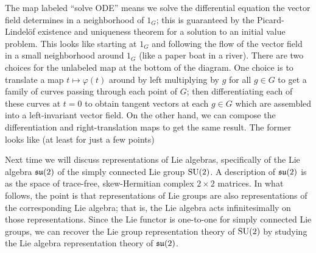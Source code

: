 \documentclass[../../rtnotes.tex]{subfiles}
\begin{document}
The map labeled ``solve ODE'' means we solve the differential equation the vector field determines in a neighborhood of $1_G$; this is guaranteed by the Picard-Lindel\"of existence and uniqueness theorem for a solution to an initial value problem. This looks like starting at $1_G$ and following the flow of the vector field in a small neighborhood around $1_G$ (like a paper boat in a river). There are two choices for the unlabeled map at the bottom of the diagram. One choice is to translate a map $t\mapsto \varphi(t)$ around by left multiplying by $g$ for all $g\in G$ to get a family of curves passing through each point of $G$; then differentiating each of these curves at $t = 0$ to obtain tangent vectors at each $g\in G$ which are assembled into a left-invariant vector field. On the other hand, we can compose the differentiation and right-translation maps to get the same result. The former looks like (at least for just a few points)
\begin{figure}[h]
  \centering
\end{figure}

Next time we will discuss representations of Lie algebras, specifically of the Lie algebra $\operatorname{\mathfrak{su}}(2)$ of the simply connected Lie group $\operatorname{SU}(2)$. A description of $\operatorname{\mathfrak{su}}(2)$ is as the space of trace-free, skew-Hermitian complex $2\times 2$ matrices. In what follows, the point is that representations of Lie groups are also representations of the corresponding Lie algebra; that is, the Lie algebra acts infinitesimally on those representations. Since the Lie functor is one-to-one for simply connected Lie groups, we can recover the Lie group representation theory of $\operatorname{SU}(2)$ by studying the Lie algebra representation theory of $\operatorname{\mathfrak{su}}(2)$.
\end{document}
